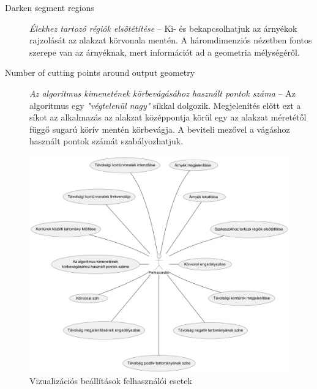 \begin{description}
    \item[Darken segment regions] \textit{Élekhez tartozó régiók elsötétítése} -- Ki- és bekapcsolhatjuk az árnyékok rajzolását az alakzat körvonala mentén. A háromdimenziós nézetben fontos szerepe van az árnyéknak, mert információt ad a geometria mélységéről.        \item[Number of cutting points around output geometry] \textit{Az algoritmus kimenetének körbevágásához használt pontok száma} -- Az algoritmus egy \textit{"végtelenül nagy"} síkkal dolgozik. Megjelenítés előtt ezt a síkot az alkalmazás az alakzat középpontja körül egy az alakzat méretétől függő sugarú körív mentén körbevágja. A beviteli mezővel a vágáshoz használt pontok számát szabályozhatjuk.
\end{description}

\begin{figure}[H]
    \centering
    \includegraphics[width=1\linewidth]{images/usecase_visualization_settings.png}
    \caption{Vizualizációs beállítások felhasználói esetek}
    \label{fig:usecase_visualization_settings-1}
\end{figure}

